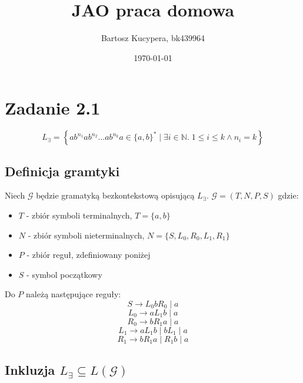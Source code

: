 \documentclass{article}
\title{JAO praca domowa}
\author{Bartosz Kucypera, bk439964}
\date{\today}
\begin{document}
\maketitle

\section*{Zadanie 2.1}
$$ L_{\exists} = \displaystyle \left\{ ab^{n_1}ab^{n_2} \dots ab^{n_k}a \in \{a, b\}^* \; 
| \; \exists i \in \mathbb{N}. \; 1 \le i \le k \land  n_i = k \right\}$$

\subsection*{Definicja gramtyki}

Niech $ \mathcal{G} $ będzie gramatyką bezkontekstową opisującą $ L_{\exists}$. $ \mathcal{G} = (T, N, P, S) $ gdzie:
\begin{itemize}
	\item[] $T$ - zbiór symboli terminalnych, $T = \{a, b\}$
	\item[] $N$ - zbiór symboli nieterminalnych, $N = \{S, L_0, R_0, L_1, R_1 \}$
	\item[] $P$ - zbiór reguł, zdefiniowany poniżej
	\item[] $S$ - symbol początkowy
\end{itemize}
Do $P$ należą następujące reguły:
$$ S \to L_0bR_0 \;| \; a$$
$$ L_0 \to aL_1b \; | \; a$$
$$ R_0 \to bR_1a \; | \; a$$
$$ L_1 \to aL_1b \; | \; bL_1 \; | \; a$$
$$ R_1 \to bR_1a \; | \; R_1b \; | \; a$$

\subsection*{Inkluzja $L_{\exists} \subseteq L(\mathcal{G})$}
\end{document}
